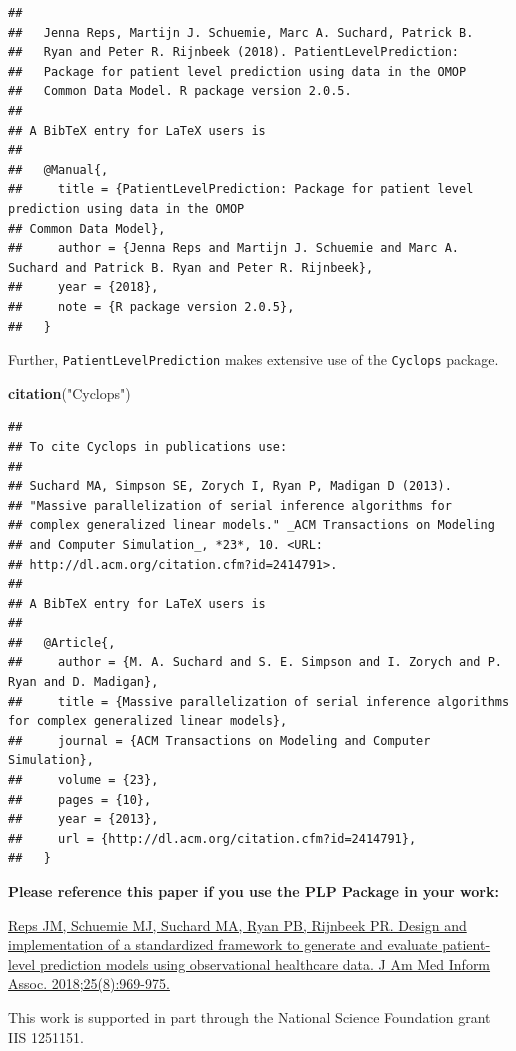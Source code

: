 \documentclass[]{article}
\newenvironment{Shaded}{\begin{snugshade}}{\end{snugshade}}
\newcommand{\KeywordTok}[1]{\textcolor[rgb]{0.13,0.29,0.53}{\textbf{#1}}}
\newcommand{\StringTok}[1]{\textcolor[rgb]{0.31,0.60,0.02}{#1}}
\newcommand{\NormalTok}[1]{#1}
\begin{document}
\begin{verbatim}
## 
##   Jenna Reps, Martijn J. Schuemie, Marc A. Suchard, Patrick B.
##   Ryan and Peter R. Rijnbeek (2018). PatientLevelPrediction:
##   Package for patient level prediction using data in the OMOP
##   Common Data Model. R package version 2.0.5.
## 
## A BibTeX entry for LaTeX users is
## 
##   @Manual{,
##     title = {PatientLevelPrediction: Package for patient level prediction using data in the OMOP
## Common Data Model},
##     author = {Jenna Reps and Martijn J. Schuemie and Marc A. Suchard and Patrick B. Ryan and Peter R. Rijnbeek},
##     year = {2018},
##     note = {R package version 2.0.5},
##   }
\end{verbatim}

Further, \texttt{PatientLevelPrediction} makes extensive use of the
\texttt{Cyclops} package.

\begin{Shaded}
\begin{Highlighting}[]
\KeywordTok{citation}\NormalTok{(}\StringTok{"Cyclops"}\NormalTok{)}
\end{Highlighting}
\end{Shaded}

\begin{verbatim}
## 
## To cite Cyclops in publications use:
## 
## Suchard MA, Simpson SE, Zorych I, Ryan P, Madigan D (2013).
## "Massive parallelization of serial inference algorithms for
## complex generalized linear models." _ACM Transactions on Modeling
## and Computer Simulation_, *23*, 10. <URL:
## http://dl.acm.org/citation.cfm?id=2414791>.
## 
## A BibTeX entry for LaTeX users is
## 
##   @Article{,
##     author = {M. A. Suchard and S. E. Simpson and I. Zorych and P. Ryan and D. Madigan},
##     title = {Massive parallelization of serial inference algorithms for complex generalized linear models},
##     journal = {ACM Transactions on Modeling and Computer Simulation},
##     volume = {23},
##     pages = {10},
##     year = {2013},
##     url = {http://dl.acm.org/citation.cfm?id=2414791},
##   }
\end{verbatim}

\textbf{Please reference this paper if you use the PLP Package in your
work:}

\href{http://dx.doi.org/10.1093/jamia/ocy032}{Reps JM, Schuemie MJ,
Suchard MA, Ryan PB, Rijnbeek PR. Design and implementation of a
standardized framework to generate and evaluate patient-level prediction
models using observational healthcare data. J Am Med Inform Assoc.
2018;25(8):969-975.}

This work is supported in part through the National Science Foundation
grant IIS 1251151.
\end{document}
